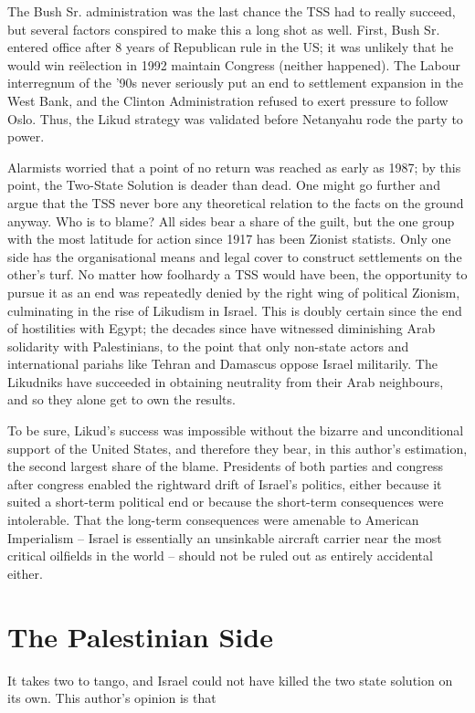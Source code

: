 \documentclass[letterpaper,12pt,twoside]{article} %
\begin{document}
\begin{multicols}{2}
The Bush Sr. administration was the last chance the TSS had to really succeed, but several factors conspired to make this a long shot as well. First, Bush Sr. entered office after 8 years of Republican rule in the US; it was unlikely that he would win reëlection in 1992  maintain Congress (neither happened). The Labour interregnum of the '90s never seriously put an end to settlement expansion in the West Bank, and the Clinton Administration refused to exert pressure to follow Oslo. Thus, the Likud strategy was validated before Netanyahu rode the party to power.

Alarmists worried that a point of no return was reached as early as 1987; by this point, the Two-State Solution is deader than dead. One might go further and argue that the TSS never bore any theoretical relation to the facts on the ground anyway. Who is to blame? All sides bear a share of the guilt, but the one group with the most latitude for action since 1917 has been Zionist statists. Only one side has the organisational means and legal cover to construct settlements on the other's turf. No matter how foolhardy a TSS would have been, the opportunity to pursue it as an end was repeatedly denied by the right wing of political Zionism, culminating in the rise of Likudism in Israel. This is doubly certain since the end of hostilities with Egypt; the decades since have witnessed diminishing Arab solidarity with Palestinians, to the point that only non-state actors and international pariahs like Tehran and Damascus oppose Israel militarily. The Likudniks have succeeded in obtaining neutrality from their Arab neighbours, and so they alone get to own the results.

To be sure, Likud's success was impossible without the bizarre and unconditional support of the United States, and therefore they bear, in this author's estimation, the second largest share of the blame. Presidents of both parties and congress after congress enabled the rightward drift of Israel's politics, either because it suited a short-term political end or because the short-term consequences were intolerable. That the long-term consequences were amenable to American Imperialism -- Israel is essentially an unsinkable aircraft carrier near the most critical oilfields in the world -- should not be ruled out as entirely accidental either. 

\section{The Palestinian Side}

It takes two to tango, and Israel could not have killed the two state solution on its own. This author's opinion is that 

\end{multicols}

\nocite{kelman2018onetwo}
\nocite{lustick2019paradigm}
\nocite{kear2022wasatiyyah}
\nocite{omalley2017israel}
\nocite{scheindlin2016confederalism}
\nocite{munayyer2019there}
\nocite{gordon2012western}
\nocite{farsakh2011one}

\vfill
\pagebreak
\printbibliography
\end{document}
